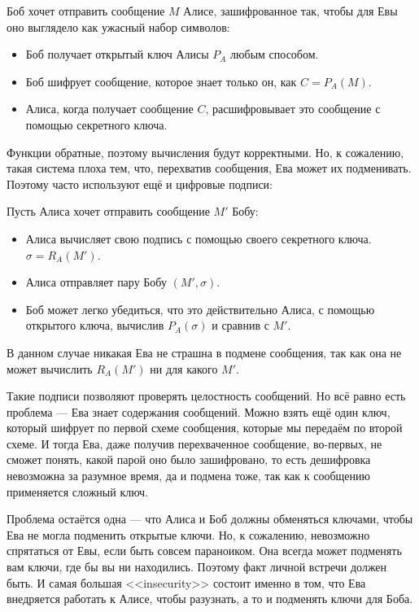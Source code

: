 \begin{center}
  Боб хочет отправить сообщение $M$ Алисе, зашифрованное так, чтобы для Евы оно
  выглядело как ужасный набор символов:
  \begin{itemize}
    \item Боб получает открытый ключ Алисы $P_{A}$ любым способом.
    \item Боб шифрует сообщение, которое знает только он, как $C = P_{A}(M)$.
    \item Алиса, когда получает сообщение $C$, расшифровывает это сообщение с
    помощью секретного ключа.
  \end{itemize}
\end{center}

Функции обратные, поэтому вычисления будут корректными. Но, к сожалению, такая 
система плоха тем, что, перехватив сообщения, Ева может их подменивать. Поэтому
часто используют ещё и цифровые подписи:

\begin{center}
Пусть Алиса хочет отправить сообщение $M'$ Бобу:
  \begin{itemize}
    \item Алиса вычисляет свою подпись с помощью своего секретного ключа.
    $\sigma = R_{A}(M')$.
    \item Алиса отправляет пару Бобу $(M', \sigma)$.
    \item Боб может легко убедиться, что это действительно Алиса, с помощью
    открытого ключа, вычислив $P_{A}(\sigma)$ и сравнив с $M'$.
  \end{itemize}
\end{center}

В данном случае никакая Ева не страшна в подмене сообщения, так как она не может
вычислить $R_{A}(M')$ ни для какого $M'$.

Такие подписи позволяют проверять целостность сообщений. Но всё равно есть
проблема --- Ева знает содержания сообщений. Можно взять ещё один ключ, который
шифрует по первой схеме сообщения, которые мы передаём по второй схеме. И тогда
Ева, даже получив перехваченное сообщение, во-первых, не сможет понять, какой
парой оно было зашифровано, то есть дешифровка невозможна за разумное время,
да и подмена тоже, так как к сообщению применяется сложный ключ.

Проблема остаётся одна --- что Алиса и Боб должны обменяться ключами, чтобы
Ева не могла подменить открытые ключи. Но, к сожалению, невозможно спрятаться
от Евы, если быть совсем параноиком. Она всегда может подменять вам ключи, где
бы вы ни находились. Поэтому факт личной встречи должен быть. И самая большая
<<insecurity>> состоит именно в том, что Ева внедряется работать к Алисе,
чтобы разузнать, а то и подменять ключи для Боба.

